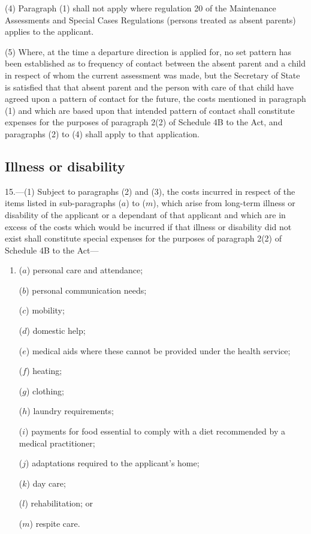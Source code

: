 \documentclass[a4paper]{article}
\begin{document}
(4) Paragraph (1) shall not apply where regulation 20 of the Maintenance Assessments and Special Cases Regulations (persons treated as absent parents) applies to the applicant.

(5) Where, at the time a departure direction is applied for, no set pattern has been established as to frequency of contact between the absent parent and a child in respect of whom the current assessment was made, but the Secretary of State is satisfied that that absent parent and the person with care of that child have agreed upon a pattern of contact for the future, the costs mentioned in paragraph (1) and which are based upon that intended pattern of contact shall constitute expenses for the purposes of paragraph 2(2) of Schedule 4B to the Act, and paragraphs (2) to (4) shall apply to that application.

\subsection[15. Illness or disability]{Illness or disability}

15.—(1) Subject to paragraphs (2) and (3), the costs incurred in respect of the items listed in sub-paragraphs ($a$) to ($m$), which arise from long-term illness or disability of the applicant or a dependant of that applicant and which are in excess of the costs which would be incurred if that illness or disability did not exist shall constitute special expenses for the purposes of paragraph 2(2) of Schedule 4B to the Act—
\begin{enumerate}\item[]
($a$) personal care and attendance;

($b$) personal communication needs;

($c$) mobility;

($d$) domestic help;

($e$) medical aids where these cannot be provided under the health service;

($f$) heating;

($g$) clothing;

($h$) laundry requirements;

($i$) payments for food essential to comply with a diet recommended by a medical practitioner;

($j$) adaptations required to the applicant’s home;

($k$) day care;

($l$) rehabilitation; or

($m$) respite care.
\end{enumerate}
\end{document}
